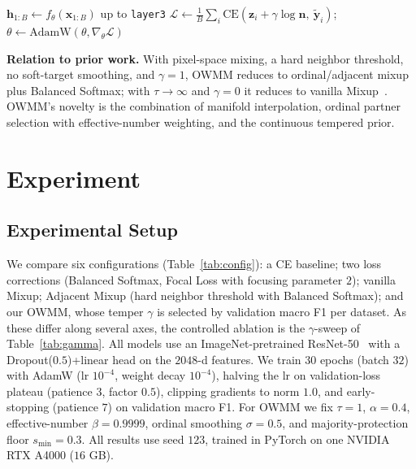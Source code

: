\documentclass[runningheads]{svproc}
\begin{document}
\begin{algorithm}[!ht]
\DontPrintSemicolon
\caption{OWMM training step on a mini-batch}
\label{alg:owmm}
$\mathbf{h}_{1:B} \leftarrow f_\theta(\mathbf{x}_{1:B})$ up to \texttt{layer3}\;
$\mathcal{L} \leftarrow \tfrac{1}{B}\sum_i \mathrm{CE}(\mathbf{z}_i + \gamma\log\mathbf{n},\ \tilde{\mathbf{y}}_i)$;\quad $\theta \leftarrow \mathrm{AdamW}(\theta, \nabla_\theta\mathcal{L})$
\end{algorithm}

\textbf{Relation to prior work.} With pixel-space mixing, a hard neighbor threshold, no soft-target smoothing, and $\gamma=1$, OWMM reduces to ordinal/adjacent mixup plus Balanced Softmax; with $\tau\!\to\!\infty$ and $\gamma=0$ it reduces to vanilla Mixup~\cite{zhang2018mixup}. OWMM's novelty is the combination of manifold interpolation, ordinal partner selection with effective-number weighting, and the continuous tempered prior.

\section{Experiment}

\subsection{Experimental Setup}

We compare six configurations (Table~\ref{tab:config}): a CE baseline; two loss corrections (Balanced Softmax, Focal Loss with focusing parameter $2$); vanilla Mixup; Adjacent Mixup (hard neighbor threshold with Balanced Softmax); and our OWMM, whose temper $\gamma$ is selected by validation macro F1 per dataset. As these differ along several axes, the controlled ablation is the $\gamma$-sweep of Table~\ref{tab:gamma}. All models use an ImageNet-pretrained ResNet-50~\cite{he2016deep} with a Dropout($0.5$)+linear head on the $2048$-d features. We train $30$ epochs (batch $32$) with AdamW (lr $10^{-4}$, weight decay $10^{-4}$), halving the lr on validation-loss plateau (patience $3$, factor $0.5$), clipping gradients to norm $1.0$, and early-stopping (patience $7$) on validation macro F1. For OWMM we fix $\tau=1$, $\alpha=0.4$, effective-number $\beta=0.9999$, ordinal smoothing $\sigma=0.5$, and majority-protection floor $s_{\min}=0.3$. All results use seed $123$, trained in PyTorch on one NVIDIA RTX A4000 ($16$ GB).
\end{document}
